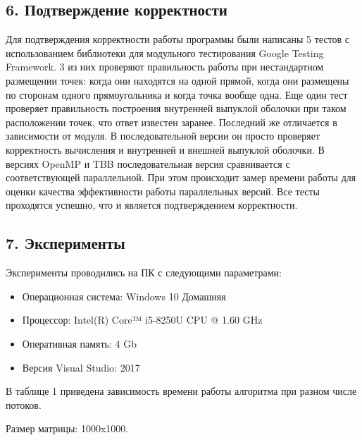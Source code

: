 \documentclass{report}
\begin{document}
\newpage


\begin{center}
\section*{6. Подтверждение корректности}
\end{center}
\par Для подтверждения корректности работы программы были написаны 5 тестов с использованием библиотеки для модульного тестирования Google Testing Framework. 3 из них проверяют правильность работы при нестандартном размещении точек: когда они находятся на одной прямой, когда они размещены по сторонам одного прямоугольника и когда точка вообще одна. Еще один тест проверяет правильность построения внутренней выпуклой оболочки при таком расположении точек, что ответ известен заранее. Последний же отличается в зависимости от модуля. В последовательной версии он просто проверяет корректность вычисления и внутренней и внешней выпуклой оболочки. В версиях OpenMP и TBB последовательная версия сравнивается с соответствующей параллельной. При этом происходит замер времени работы для оценки качества эффективности работы параллельных версий. Все тесты проходятся успешно, что и является подтверждением корректности.

\newpage


\begin{center}
\section*{7. Эксперименты}
\end{center}
\par Эксперименты проводились на ПК с следующими параметрами:

\begin{itemize}
\item Операционная система: Windows 10 Домашняя
\item Процессор: Intel(R) Core™ i5-8250U CPU @ 1.60 GHz
\item Оперативная память: 4 Gb
\item Версия Visual Studio: 2017
\end{itemize}

\par В таблице 1 приведена зависимость времени работы алгоритма при разном числе потоков. 
\par Размер матрицы: 1000x1000.
\end{document}
